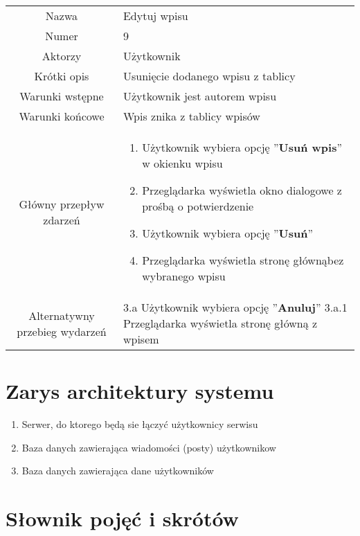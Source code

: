 \documentclass[a4paper]{article}
\begin{document}
\begin{tabular}{c p{10cm}}
Nazwa& Edytuj wpisu\\
Numer	& 9\\
Aktorzy &	Użytkownik\\
Krótki opis & Usunięcie dodanego wpisu z tablicy\\
Warunki wstępne& Użytkownik jest autorem wpisu\\
Warunki końcowe& Wpis znika z tablicy wpisów\\
Główny przepływ zdarzeń&
\begin{enumerate}
\item Użytkownik wybiera opcję ''\textbf{Usuń wpis}'' w okienku wpisu
\item Przeglądarka wyświetla okno dialogowe z prośbą o potwierdzenie
\item Użytkownik wybiera opcję ''\textbf{Usuń}''
\item Przeglądarka wyświetla stronę głównąbez wybranego wpisu
\end{enumerate} \\

Alternatywny przebieg wydarzeń & 
3.a Użytkownik wybiera opcję ''\textbf{Anuluj}'' \newline 
3.a.1 Przeglądarka wyświetla stronę główną z wpisem
\\
\hline
\end{tabular}


\section{Zarys architektury systemu}
\begin{enumerate}
\item Serwer, do ktorego będą sie łączyć użytkownicy serwisu
\item Baza danych zawierająca wiadomości (posty) użytkownikow
\item Baza danych zawierająca dane użytkowników
\end{enumerate}


\section{Słownik pojęć i skrótów}
\end{document}
